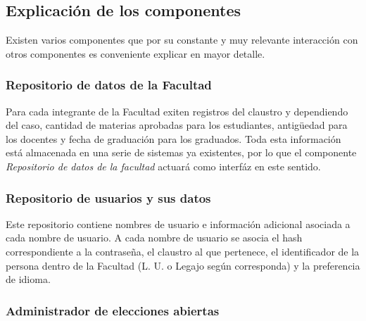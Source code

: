 \subsection{Explicación de los componentes}
\label{explicaciones}
Existen varios componentes que por su constante y muy relevante interacción con otros componentes es conveniente explicar en mayor detalle.


\subsubsection{Repositorio de datos de la Facultad}
Para cada integrante de la Facultad exiten registros del claustro y dependiendo del caso, cantidad de materias aprobadas para los estudiantes, antigüedad para los docentes y fecha de graduación para los graduados. Toda esta información está almacenada en una serie de sistemas ya existentes, por lo que el componente \emph{Repositorio de datos de la facultad} actuará como interfáz en este sentido.


\subsubsection{Repositorio de usuarios y sus datos}


Este repositorio contiene nombres de usuario e información adicional asociada a cada nombre de usuario. A cada nombre de usuario se asocia el hash correspondiente a la contraseña, el claustro al que pertenece, el identificador de la persona dentro de la Facultad (L. U. o Legajo según corresponda) y la preferencia de idioma. 


\subsubsection{Administrador de elecciones abiertas}

\label{admin_elecciones}

